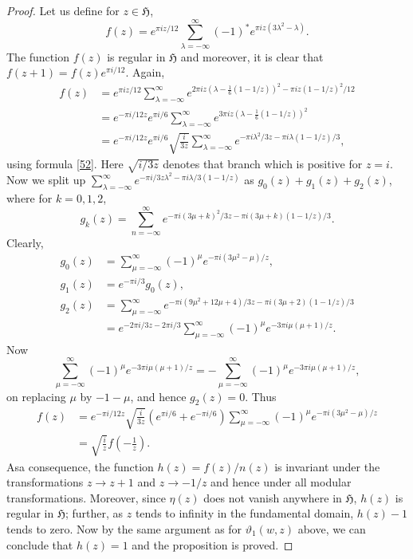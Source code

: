 \begin{proof}
Let us define for $z\in\mathfrak{H}$,
$$
f(z)=e^{\pi iz/12}\sum^{\infty}_{\lambda=-\infty}(-1)^{\ast}e^{\pi
  iz(3\lambda^{2}-\lambda)}.
$$
The function $f(z)$ is regular in $\mathfrak{H}$ and moreover, it is
clear that $f(z+1)=f(z)e^{\pi i/12}$. Again,
\begin{align*}
f(z) &= e^{\pi iz/12}\sum^{\infty}_{\lambda=-\infty}e^{2\pi
  iz(\lambda-\frac{1}{6}(1-1/z))^{2}-\pi iz(1-1/z)^{2}/12}\\
&= e^{-\pi i/12z}e^{\pi i/6}\sum^{\infty}_{\lambda=-\infty}e^{3\pi
  iz(\lambda-\frac{1}{6}(1-1/z))^{2}}\\ 
&= e^{-\pi i/12z}e^{\pi
  i/6}\sqrt{\frac{i}{3z}}\sum^{\infty}_{\lambda=-\infty}e^{-\pi
  i\lambda^{2}/3z-\pi i\lambda(1-1/z)/3}, 
\end{align*}\pageoriginale
using formula \eqref{52}. Here $\sqrt{i/3z}$ denotes that branch which
is positive for $z=i$. Now we split up
$\sum\limits^{\infty}_{\lambda=-\infty}e^{-\pi i/3z\lambda^{2}-\pi
  i\lambda/3(1-1/z)}$ as $g_{0}(z)+g_{1}(z)+g_{2}(z)$, where for
$k=0,1,2$,
$$
g_{k}(z)=\sum^{\infty}_{n=-\infty}e^{-\pi i(3\mu+k)^{2}/3z-\pi
  i(3\mu+k)(1-1/z)/3}. 
$$
Clearly,
\begin{align*}
g_{0}(z) &= \sum^{\infty}_{\mu=-\infty}(-1)^{\mu}e^{-\pi
  i(3\mu^{2}-\mu)/z},\\
g_{1}(z) &= e^{-\pi i/3}g_{0}(z),\\
g_{2}(z) &= \sum^{\infty}_{\mu=-\infty}e^{-\pi
  i(9\mu^{2}+12\mu+4)/3z-\pi i(3\mu+2)(1-1/z)/3}\\
&= e^{-2\pi i/3z-2\pi
  i/3}\sum^{\infty}_{\mu=-\infty}(-1)^{\mu}e^{-3\pi i\mu(\mu+1)/z}.
\end{align*}
Now
$$
\sum^{\infty}_{\mu=-\infty}(-1)^{\mu}e^{-3\pi
  i\mu(\mu+1)/z}=-\sum^{\infty}_{\mu=-\infty}(-1)^{\mu}e^{-3\pi
  i\mu(\mu+1)/z}, 
$$
on replacing $\mu$ by $-1-\mu$, and hence $g_{2}(z)=0$. Thus
\begin{align*}
f(z) &= e^{-\pi i/12z}\sqrt{\frac{i}{3z}}(e^{\pi i/6}+e^{-\pi
  i/6})\sum^{\infty}_{\mu=-\infty}(-1)^{\mu}e^{-\pi
  i(3\mu^{2}-\mu)/z}\\
&= \sqrt{\frac{i}{z}}f\left(-\frac{1}{z}\right).
\end{align*}
As\pageoriginale a consequence, the function $h(z)=f(z)/n(z)$ is
invariant under the transformations $z\to z+1$ and $z\to -1/z$ and
hence under all modular transformations. Moreover, since $\eta(z)$
does not vanish anywhere in $\mathfrak{H}$, $h(z)$ is regular in
$\mathfrak{H}$; further, as $z$ tends to infinity in the fundamental
domain, $h(z)-1$ tends to zero. Now by the same argument as for
$\vartheta_{1}(w,z)$ above, we can conclude that $h(z)=1$ and the
proposition is proved.
\end{proof}

